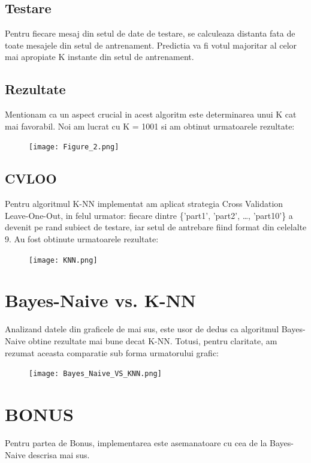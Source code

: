 \documentclass{article}
\begin{document}
\subsection{Testare}
Pentru fiecare mesaj din setul de date de testare, se calculeaza distanta fata de toate mesajele din setul de antrenament. Predictia va fi votul majoritar al celor mai apropiate K instante din setul de antrenament.
\subsection{Rezultate}
    Mentionam ca un aspect crucial in acest algoritm este determinarea unui K cat mai favorabil. Noi am lucrat cu K = 1001 si am obtinut urmatoarele rezultate:


    \newpage
    \begin{figure}[ht]
    \texttt{[image: Figure\_2.png]}
    \label{fig:result_image}
    \end{figure}


\subsection{CVLOO}
    Pentru algoritmul K-NN implementat am aplicat strategia Cross Validation Leave-One-Out, in felul urmator: fiecare dintre \{'part1', 'part2', \dots , 'part10'\} a devenit pe rand subiect de testare, iar setul de antrebare fiind format din celelalte 9. Au fost obtinute urmatoarele rezultate:
    \newpage
    \begin{figure}[ht]
    \texttt{[image: KNN.png]}
    \label{fig:result_image}
    \end{figure}

\section{ Bayes-Naive vs. K-NN}
    Analizand datele din graficele de mai sus, este usor de dedus ca algoritmul Bayes-Naive obtine rezultate mai bune decat K-NN.
    Totusi, pentru claritate, am rezumat aceasta comparatie sub forma urmatorului grafic:
    \newpage
    \begin{figure}[ht]
    \texttt{[image: Bayes\_Naive\_VS\_KNN.png]}
    \label{fig:result_image}
    \end{figure}

\section{BONUS}
Pentru partea de Bonus, implementarea este asemanatoare cu cea de la Bayes-Naive descrisa mai sus.
\end{document}
